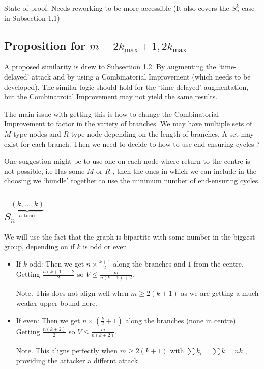 \documentclass[a4paper,10pt]{article}
\theoremstyle{definition}
\theoremstyle{definition}
\theoremstyle{remark}
\theoremstyle{definition}
\begin{document}
State of proof: Needs reworking to be more accessible (It also covers the $S_{n}^{k}$ case in Subsection 1.1)

\subsection[]{Proposition for $m=2k_{\max}+1 , 2k_{\max}$}
A proposed similarity is drew to Subsection 1.2. By augmenting the `time-delayed' attack and by using a Combinatorial Improvement (which needs to be developed). The similar logic should hold for the `time-delayed' augmentation, but the Combinatroial Improvement may not yield the same results.

The main issue with getting this is how to change the Combinatorial Improvement to factor in the variety of branches. We may have multiple sets of $M$ type nodes and $R$ type node depending on the length of branches. A set may exist for each branch. Then we need to decide to how to use end-ensuring cycles ?

One suggestion might be to use one on each node where return to the centre is not possible, i.e Has some $M$ or $R$ , then the ones in which we can include in the choosing we `bundle' together to use the minimum number of end-ensuring cycles.

\subsection[]{$S_{n}^{\underbrace{(k,...,k)}_{n \text{ times}}}$}
We will use the fact that the graph is bipartite with some number in the biggest group, depending on if $k$ is odd or even

\begin{itemize}
\item If $k$ odd:
Then we get $n \times \frac{k+1}{2}$ along the branches and $1$ from the centre. Getting $\frac{n(k+1)+2}{2}$ so $V \leq \frac{m}{n(k+1)+2}$.

Note. This does not align well when $m \geq 2(k+1)$ as we are getting a much weaker upper bound here.

\item If even:
Then we get $n \times (\frac{k}{2}+1)$ along the branches (none in centre). Getting $\frac{n(k+2)}{2}$ so $V \leq \frac{m}{n(k+2)}$.

Note. This aligns perfectly when $m \geq 2(k+1)$ with $\sum k_{i}=\sum k=nk$ , providing the attacker a differnt attack
 
\end{itemize}
  
\end{document}
